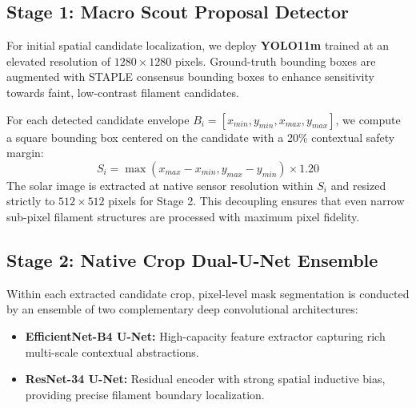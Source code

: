 \documentclass[conference]{IEEEtran}
\begin{document}
\subsection{Stage 1: Macro Scout Proposal Detector}
For initial spatial candidate localization, we deploy \textbf{YOLO11m} \cite{glenn2024yolo11} trained at an elevated resolution of $1280\times1280$ pixels. Ground-truth bounding boxes are augmented with STAPLE consensus bounding boxes to enhance sensitivity towards faint, low-contrast filament candidates.

For each detected candidate envelope $B_i = [x_{min}, y_{min}, x_{max}, y_{max}]$, we compute a square bounding box centered on the candidate with a 20\% contextual safety margin:
\begin{equation}
S_i = \max(x_{max} - x_{min}, y_{max} - y_{min}) \times 1.20
\end{equation}
The solar image is extracted at native sensor resolution within $S_i$ and resized strictly to $512\times512$ pixels for Stage 2. This decoupling ensures that even narrow sub-pixel filament structures are processed with maximum pixel fidelity.

\subsection{Stage 2: Native Crop Dual-U-Net Ensemble}
Within each extracted candidate crop, pixel-level mask segmentation is conducted by an ensemble of two complementary deep convolutional architectures:
\begin{itemize}
    \item \textbf{EfficientNet-B4 U-Net:} High-capacity feature extractor capturing rich multi-scale contextual abstractions.
    \item \textbf{ResNet-34 U-Net:} Residual encoder with strong spatial inductive bias, providing precise filament boundary localization.
\end{itemize}
\end{document}
